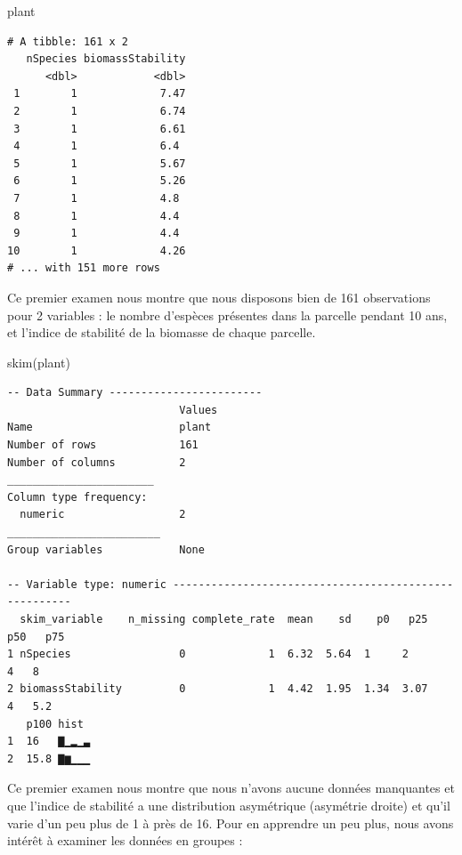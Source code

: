 \documentclass[
  a4paper,
]{article}
\newenvironment{Shaded}{\begin{snugshade}}{\end{snugshade}}
\newcommand{\FunctionTok}[1]{\textcolor[rgb]{0.39,0.29,0.61}{#1}}
\newcommand{\NormalTok}[1]{\textcolor[rgb]{0.12,0.11,0.11}{#1}}
\begin{document}
\begin{Shaded}
\begin{Highlighting}[]
\NormalTok{plant}
\end{Highlighting}
\end{Shaded}

\begin{verbatim}
# A tibble: 161 x 2
   nSpecies biomassStability
      <dbl>            <dbl>
 1        1             7.47
 2        1             6.74
 3        1             6.61
 4        1             6.4 
 5        1             5.67
 6        1             5.26
 7        1             4.8 
 8        1             4.4 
 9        1             4.4 
10        1             4.26
# ... with 151 more rows
\end{verbatim}

Ce premier examen nous montre que nous disposons bien de 161 observations pour 2 variables : le nombre d'espèces présentes dans la parcelle pendant 10 ans, et l'indice de stabilité de la biomasse de chaque parcelle.

\begin{Shaded}
\begin{Highlighting}[]
\FunctionTok{skim}\NormalTok{(plant)}
\end{Highlighting}
\end{Shaded}

\begin{verbatim}
-- Data Summary ------------------------
                           Values
Name                       plant 
Number of rows             161   
Number of columns          2     
_______________________          
Column type frequency:           
  numeric                  2     
________________________         
Group variables            None  

-- Variable type: numeric ------------------------------------------------------
  skim_variable    n_missing complete_rate  mean    sd    p0   p25   p50   p75
1 nSpecies                 0             1  6.32  5.64  1     2        4   8  
2 biomassStability         0             1  4.42  1.95  1.34  3.07     4   5.2
   p100 hist 
1  16   ▇▁▂▁▃
2  15.8 ▇▆▁▁▁
\end{verbatim}

Ce premier examen nous montre que nous n'avons aucune données manquantes et que l'indice de stabilité a une distribution asymétrique (asymétrie droite) et qu'il varie d'un peu plus de 1 à près de 16. Pour en apprendre un peu plus, nous avons intérêt à examiner les données en groupes :
\end{document}
